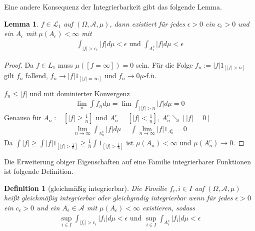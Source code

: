 \documentclass[]{article}
\newtheorem{lemma}{Lemma}
\newtheorem{definition}{Definition}
\begin{document}
Eine andere Konsequenz der Integrierbarkeit gibt das folgende Lemma.

\begin{lemma}
	$f\in\mathcal{L}_1$ auf $(\Omega, \mathcal{A}, \mu)$, dann existiert für jedes $\epsilon > 0$ ein $c_\epsilon > 0 $ und ein $A_\epsilon$ mit $\mu(A_\epsilon) < \infty$ mit
	\begin{align*}
		\int_{|f|>c_\epsilon} |f| d\mu < \epsilon \text{ und } \int_{A^c_\epsilon} |f| d\mu < \epsilon
	\end{align*}
\end{lemma}

\begin{proof}
	Da $f\in L_1$ muss $\mu([f=\infty])=0$ sein. Für die Folge $f_n:=|f|1_{[|f|>n]}$ gilt $f_n$ fallend, $f_n\rightarrow |f|1_{[|f|=\infty]}$ und $f_n\rightarrow0 \mu$-f.ü.
	
	$f_n \leq |f|$ und mit dominierter Konvergenz
	\begin{align*}
		\lim_n \int f_n d\mu = \lim \int_{[|f|>n} |f| d\mu = 0
	\end{align*}
	Genauso für $A_n := [|f|\geq \frac{1}{n}]$ und $A^c_n = [|f|<\frac{1}{n}]$, $A_n^c \searrow [|f|=0]$
	\begin{align*}
		\lim_{n\rightarrow\infty} \int_{A_n^c} |f| d\mu = \int \lim\limits_{n\rightarrow\infty} |f| 1_{A_n^c} = 0
	\end{align*}
	Da $\int|f| \geq \int |f| 1_{[|f|>\frac{1}{n}]} \geq \frac{1}{n} \int 1_{[|f|>\frac{1}{n}]}$ ist $\mu(A_n) < \infty$ und $\mu(A_n^c) \rightarrow 0$.
\end{proof}

Die Erweiterung obiger Eigenschaften auf eine Familie integrierbarer Funktionen ist folgende Definition.

\begin{definition}[gleichmäßig integrierbar]
	Die Familie ${f_i, i \in I}$ auf $(\Omega, \mathcal{A}, \mu)$ heißt gleichmäßig integrierbar oder gleichgradig integrierbar wenn für jedes $\epsilon > 0 $ ein $c_\epsilon > 0 $ und ein $A_\epsilon  \in \mathcal{A}$ mit $\mu(A_\epsilon) < \infty$ existieren, sodass
	\begin{align*}
		\sup_{i\in I} \int_{|f_i| > c_\epsilon} |f_i| d\mu < \epsilon \text{ und } \sup_{i\in I}\int_{A^c_\epsilon} |f_i| d\mu < \epsilon
	\end{align*}
\end{definition}
\end{document}
